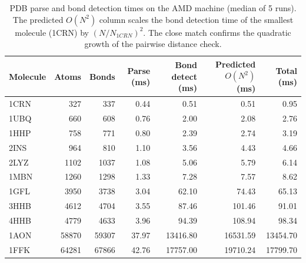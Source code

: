 \begin{table}[H]
    \centering
    \small
    \begin{tabular}{lrrrrrr}
        \toprule
        Molecule & Atoms & Bonds & Parse (ms) & Bond detect (ms) & Predicted $O(N^2)$ (ms) & Total (ms) \\
        \midrule
        1CRN & 327 & 337 & 0.44 & 0.51 & 0.51 & 0.95 \\
        1UBQ & 660 & 608 & 0.76 & 2.00 & 2.08 & 2.76 \\
        1HHP & 758 & 771 & 0.80 & 2.39 & 2.74 & 3.19 \\
        2INS & 964 & 810 & 1.10 & 3.56 & 4.43 & 4.66 \\
        2LYZ & 1102 & 1037 & 1.08 & 5.06 & 5.79 & 6.14 \\
        1MBN & 1260 & 1298 & 1.33 & 7.28 & 7.57 & 8.62 \\
        1GFL & 3950 & 3738 & 3.04 & 62.10 & 74.43 & 65.13 \\
        3HHB & 4612 & 4704 & 3.55 & 87.46 & 101.46 & 91.01 \\
        4HHB & 4779 & 4633 & 3.96 & 94.39 & 108.94 & 98.34 \\
        1AON & 58870 & 59307 & 37.97 & 13416.80 & 16531.59 & 13454.70 \\
        1FFK & 64281 & 67866 & 42.76 & 17757.00 & 19710.24 & 17799.70 \\
        \bottomrule
    \end{tabular}
    \caption{PDB parse and bond detection times on the AMD machine (median of 5 runs). The predicted $O(N^2)$ column scales the bond detection time of the smallest molecule (1CRN) by $(N/N_{1CRN})^2$. The close match confirms the quadratic growth of the pairwise distance check.}
    \label{tab:load_amd}
\end{table}
